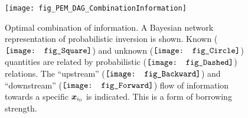 \begin{figure}[ht]
  \centering
  \texttt{[image: fig\_PEM\_DAG\_CombinationInformation]}
  \caption[Optimal combination of information]{Optimal combination of information.
           A Bayesian network representation of probabilistic inversion is shown.
           Known (\(\vcenter{\hbox{\protect\texttt{[image: fig\_Square]}}}\))
           and unknown (\(\vcenter{\hbox{\protect\texttt{[image: fig\_Circle]}}}\)) quantities
           are related by probabilistic (\(\vcenter{\hbox{\protect\texttt{[image: fig\_Dashed]}}}\)) relations.
           The ``upstream'' (\(\vcenter{\hbox{\protect\texttt{[image: fig\_Backward]}}}\))
           and ``downstream'' (\(\vcenter{\hbox{\protect\texttt{[image: fig\_Forward]}}}\))
           flow of information towards a specific \(\bm{x}_{i_0}\) is indicated.
           This is a form of borrowing strength.
          }
  \label{fig:PEM:DAG:CombInf}
\end{figure}